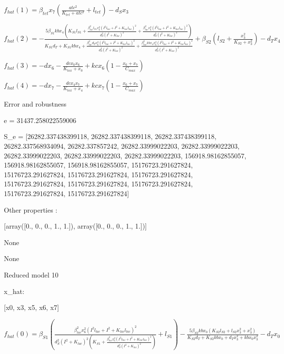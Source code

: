 $f_{hat}(1)=\beta_{tet} x_{7} \left(\frac{atc^{2}}{K_{tet} + atc^{2}} + l_{tet}\right) - d_{S} x_{3}$


$f_{hat}(2)=- \frac{5 \beta_{S1} kb x_{4} \left(K_{S1} l_{S1} + \frac{\beta_{lac}^{2} l_{S1} x_{6}^{2} \left(I^{2} l_{lac} + I^{2} + K_{lac} l_{lac}\right)^{2}}{d_{S}^{2} \left(I^{2} + K_{lac}\right)^{2}} + \frac{\beta_{lac}^{2} x_{6}^{2} \left(I^{2} l_{lac} + I^{2} + K_{lac} l_{lac}\right)^{2}}{d_{S}^{2} \left(I^{2} + K_{lac}\right)^{2}}\right)}{K_{S1} d_{T} + K_{S1} kb x_{4} + \frac{\beta_{lac}^{2} d_{T} x_{6}^{2} \left(I^{2} l_{lac} + I^{2} + K_{lac} l_{lac}\right)^{2}}{d_{S}^{2} \left(I^{2} + K_{lac}\right)^{2}} + \frac{\beta_{lac}^{2} kb x_{4} x_{6}^{2} \left(I^{2} l_{lac} + I^{2} + K_{lac} l_{lac}\right)^{2}}{d_{S}^{2} \left(I^{2} + K_{lac}\right)^{2}}} + \beta_{S2} \left(l_{S2} + \frac{x_{3}^{2}}{K_{S2} + x_{3}^{2}}\right) - d_{T} x_{4}$


$f_{hat}(3)=- d x_{6} - \frac{dc x_{0} x_{6}}{K_{tox} + x_{0}} + kc x_{6} \left(1 - \frac{x_{6} + x_{7}}{C_{max}}\right)$


$f_{hat}(4)=- d x_{7} - \frac{dc x_{4} x_{7}}{K_{tox} + x_{4}} + kc x_{7} \left(1 - \frac{x_{6} + x_{7}}{C_{max}}\right)$



Error and robustness 


e = 31437.258022559006

S_e = [26282.337438399118, 26282.337438399118, 26282.337438399118, 26282.337568934094, 26282.337857242, 26282.33999022203, 26282.33999022203, 26282.33999022203, 26282.33999022203, 26282.33999022203, 156918.98162855057, 156918.98162855057, 156918.98162855057, 15176723.291627824, 15176723.291627824, 15176723.291627824, 15176723.291627824, 15176723.291627824, 15176723.291627824, 15176723.291627824, 15176723.291627824, 15176723.291627824]

Other properties :


[array([0., 0., 0., 1., 1.]), array([0., 0., 0., 1., 1.])]

None

None

Reduced model 10

x_{hat}: 

[x0, x3, x5, x6, x7]


$f_{hat}(0)=\beta_{S1} \left(\frac{\beta_{lac}^{2} x_{6}^{2} \left(I^{2} l_{lac} + I^{2} + K_{lac} l_{lac}\right)^{2}}{d_{S}^{2} \left(I^{2} + K_{lac}\right)^{2} \left(K_{S1} + \frac{\beta_{lac}^{2} x_{6}^{2} \left(I^{2} l_{lac} + I^{2} + K_{lac} l_{lac}\right)^{2}}{d_{S}^{2} \left(I^{2} + K_{lac}\right)^{2}}\right)} + l_{S1}\right) - \frac{5 \beta_{S2} kb x_{0} \left(K_{S2} l_{S2} + l_{S2} x_{3}^{2} + x_{3}^{2}\right)}{K_{S2} d_{T} + K_{S2} kb x_{0} + d_{T} x_{3}^{2} + kb x_{0} x_{3}^{2}} - d_{T} x_{0}$



